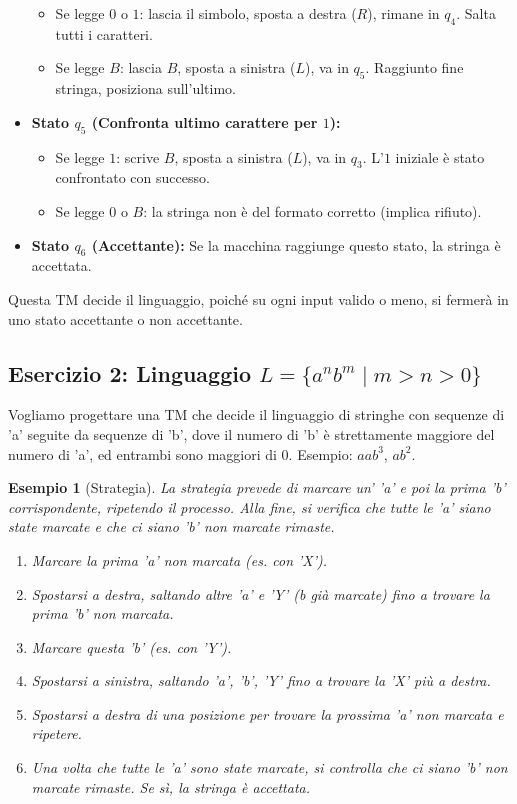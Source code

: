 \documentclass[a4paper]{article}
\newtheorem{example}{Esempio}
\begin{document}
\begin{itemize}
    \begin{itemize}
        \item Se legge $0$ o $1$: lascia il simbolo, sposta a destra ($R$), rimane in $q_4$. Salta tutti i caratteri.
        \item Se legge $B$: lascia $B$, sposta a sinistra ($L$), va in $q_5$. Raggiunto fine stringa, posiziona sull'ultimo.
    \end{itemize}
    \item \textbf{Stato $q_5$ (Confronta ultimo carattere per $1$):}
    \begin{itemize}
        \item Se legge $1$: scrive $B$, sposta a sinistra ($L$), va in $q_3$. L'$1$ iniziale è stato confrontato con successo.
        \item Se legge $0$ o $B$: la stringa non è del formato corretto (implica rifiuto).
    \end{itemize}
    \item \textbf{Stato $q_6$ (Accettante):} Se la macchina raggiunge questo stato, la stringa è accettata.
\end{itemize}
Questa TM decide il linguaggio, poiché su ogni input valido o meno, si fermerà in uno stato accettante o non accettante.

\subsection{Esercizio 2: Linguaggio $L = \{a^n b^m \mid m > n > 0\}$}

Vogliamo progettare una TM che decide il linguaggio di stringhe con sequenze di 'a' seguite da sequenze di 'b', dove il numero di 'b' è strettamente maggiore del numero di 'a', ed entrambi sono maggiori di $0$. Esempio: $aab^{3}$, $ab^{2}$.

\begin{example}[Strategia]
La strategia prevede di marcare un' 'a' e poi la prima 'b' corrispondente, ripetendo il processo. Alla fine, si verifica che tutte le 'a' siano state marcate e che ci siano 'b' non marcate rimaste.
\begin{enumerate}
    \item Marcare la prima 'a' non marcata (es. con 'X').
    \item Spostarsi a destra, saltando altre 'a' e 'Y' (b già marcate) fino a trovare la prima 'b' non marcata.
    \item Marcare questa 'b' (es. con 'Y').
    \item Spostarsi a sinistra, saltando 'a', 'b', 'Y' fino a trovare la 'X' più a destra.
    \item Spostarsi a destra di una posizione per trovare la prossima 'a' non marcata e ripetere.
    \item Una volta che tutte le 'a' sono state marcate, si controlla che ci siano 'b' non marcate rimaste. Se sì, la stringa è accettata.
\end{enumerate}
\end{example}
\end{document}
